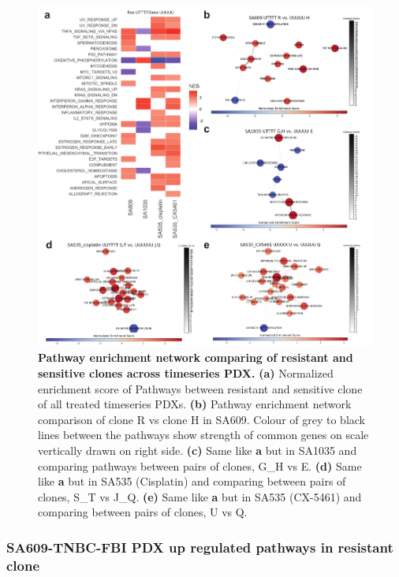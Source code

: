 \begin{figure}
\centering
  \includegraphics[width=\textwidth]{Figures/fig6resistantsensitivenetwork.pdf}
\caption[DE of resistant and sensitive clonealign defined clones]
	{\small
	\textbf{Pathway enrichment network comparing of resistant and sensitive clones across timeseries PDX.}
	\textbf{(a)} Normalized enrichment score of Pathways between resistant and sensitive clone of all treated timeseries PDXs.
	    \textbf{(b)} Pathway enrichment network comparison of clone R vs clone H in SA609. Colour of grey to black lines between the pathways show strength of common genes on scale vertically drawn on right side. 
	     \textbf{(c)} Same like \textbf{a} but in SA1035  and comparing pathways between pairs of clones, G\_H vs E. 
	     \textbf{(d)} Same like \textbf{a} but in SA535 (Cisplatin) and comparing between pairs of clones, S\_T vs J\_Q.
	 \textbf{(e)} Same like \textbf{a} but in SA535 (CX-5461) and comparing between pairs of clones, U vs Q.}
	
	\label{fig:fig6resistantsensitivenetwork}
\end{figure}










\subsubsection{SA609-TNBC-FBI PDX up regulated pathways in resistant clone}



